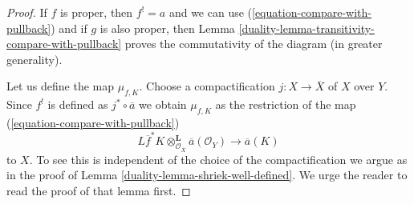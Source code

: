 \begin{proof}

If $f$ is proper, then $f^! = a$ and we can use
(\ref{equation-compare-with-pullback}) and if $g$ is also proper,
then Lemma \ref{duality-lemma-transitivity-compare-with-pullback} proves
the commutativity of the diagram (in greater generality).

\medskip\noindent
Let us define the map $\mu_{f, K}$. Choose a compactification
$j : X \to \overline{X}$ of $X$ over $Y$. Since $f^!$ is defined
as $j^* \circ \overline{a}$ we obtain $\mu_{f, K}$ as the restriction
of the map (\ref{equation-compare-with-pullback})
$$
L\overline{f}^*K \otimes_{\mathcal{O}_{\overline{X}}}^\mathbf{L}
\overline{a}(\mathcal{O}_Y)
\longrightarrow
\overline{a}(K)
$$
to $X$. To see this is independent of the choice of the compactification
we argue as in the proof of Lemma \ref{duality-lemma-shriek-well-defined}.
We urge the reader to read the proof of that lemma first.


\end{proof}
